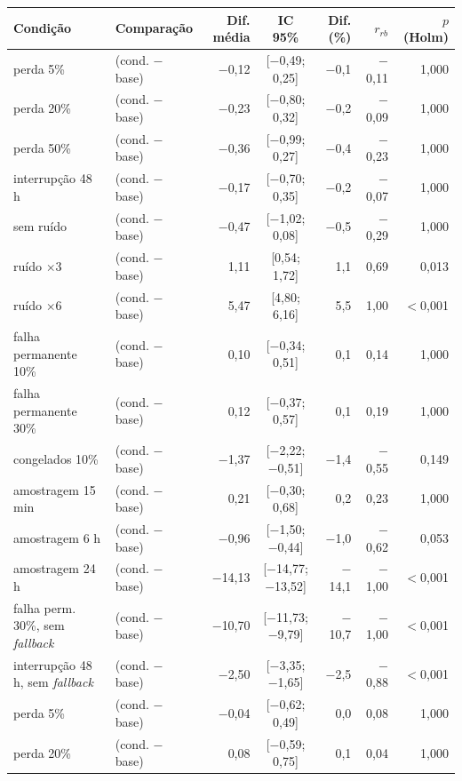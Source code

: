 \begin{tabular}{@{}llrcrrr@{}}
\toprule
Condição & Comparação & Dif. média & IC 95\% & Dif. (\%) & $r_{rb}$ & $p$ (Holm) \\
\midrule
perda 5\% & \polBOR{} (cond. $-$ base) & $-$0,12 & [$-$0,49; 0,25] & $-$0,1 & $-$0,11 & 1,000 \\
perda 20\% & \polBOR{} (cond. $-$ base) & $-$0,23 & [$-$0,80; 0,32] & $-$0,2 & $-$0,09 & 1,000 \\
perda 50\% & \polBOR{} (cond. $-$ base) & $-$0,36 & [$-$0,99; 0,27] & $-$0,4 & $-$0,23 & 1,000 \\
interrupção 48 h & \polBOR{} (cond. $-$ base) & $-$0,17 & [$-$0,70; 0,35] & $-$0,2 & $-$0,07 & 1,000 \\
sem ruído & \polBOR{} (cond. $-$ base) & $-$0,47 & [$-$1,02; 0,08] & $-$0,5 & $-$0,29 & 1,000 \\
ruído $\times$3 & \polBOR{} (cond. $-$ base) & 1,11 & [0,54; 1,72] & 1,1 & 0,69 & 0,013 \\
ruído $\times$6 & \polBOR{} (cond. $-$ base) & 5,47 & [4,80; 6,16] & 5,5 & 1,00 & $<$0,001 \\
falha permanente 10\% & \polBOR{} (cond. $-$ base) & 0,10 & [$-$0,34; 0,51] & 0,1 & 0,14 & 1,000 \\
falha permanente 30\% & \polBOR{} (cond. $-$ base) & 0,12 & [$-$0,37; 0,57] & 0,1 & 0,19 & 1,000 \\
congelados 10\% & \polBOR{} (cond. $-$ base) & $-$1,37 & [$-$2,22; $-$0,51] & $-$1,4 & $-$0,55 & 0,149 \\
amostragem 15 min & \polBOR{} (cond. $-$ base) & 0,21 & [$-$0,30; 0,68] & 0,2 & 0,23 & 1,000 \\
amostragem 6 h & \polBOR{} (cond. $-$ base) & $-$0,96 & [$-$1,50; $-$0,44] & $-$1,0 & $-$0,62 & 0,053 \\
amostragem 24 h & \polBOR{} (cond. $-$ base) & $-$14,13 & [$-$14,77; $-$13,52] & $-$14,1 & $-$1,00 & $<$0,001 \\
falha perm. 30\%, sem \emph{fallback} & \polBOR{} (cond. $-$ base) & $-$10,70 & [$-$11,73; $-$9,79] & $-$10,7 & $-$1,00 & $<$0,001 \\
interrupção 48 h, sem \emph{fallback} & \polBOR{} (cond. $-$ base) & $-$2,50 & [$-$3,35; $-$1,65] & $-$2,5 & $-$0,88 & $<$0,001 \\
perda 5\% & \polC{} (cond. $-$ base) & $-$0,04 & [$-$0,62; 0,49] & 0,0 & 0,08 & 1,000 \\
perda 20\% & \polC{} (cond. $-$ base) & 0,08 & [$-$0,59; 0,75] & 0,1 & 0,04 & 1,000 \\

\end{tabular}
